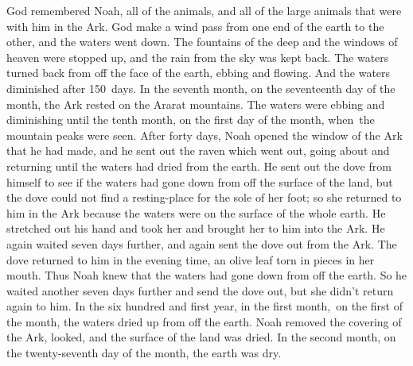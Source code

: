 
\begin{inparaenum}
     God remembered Noah, all of the animals, and all of the large animals that were with him in the Ark. God make a wind pass from one end of the earth to the other, and the waters went down.%
     The fountains of the deep and the windows of heaven were stopped up, and the rain from the sky was kept back.%
     The waters turned back from off the face of the earth, ebbing and flowing. And the waters diminished after 150~days.%
     In the seventh month, on the seventeenth day of the month, the Ark rested on the Ararat mountains.%
     The waters were ebbing and diminishing until the tenth month, on the first day of the month, when\understood\ the mountain peaks were seen.%
     After forty days, Noah opened the window of the Ark that he had made,%
     and he sent out the raven which went out, going about and returning until the waters had dried from the earth.%
     He sent out the dove from himself to see if the waters had gone down from off the surface of the land,%
     but the dove could not find a resting-place for the sole of her foot; so she returned to him in the Ark because the waters were on the surface of the whole earth. He stretched out his hand and took her and brought her to him into the Ark.%
     He again waited seven days further, and again sent the dove out from the Ark.%
     The dove returned to him in the evening time, an olive leaf torn in pieces in her mouth. Thus Noah knew that the waters had gone down from off the earth.%
     So he waited another seven days further and send the dove out, but she didn't return again to him.%
     In the six hundred and first year, in the first month,\understood\ on the first of the month, the waters dried up from off the earth. Noah removed the covering of the Ark, looked, and the surface of the land was dried.%
     In the second month, on the twenty-seventh day of the month, the earth was dry.%
    

\end{inparaenum}
